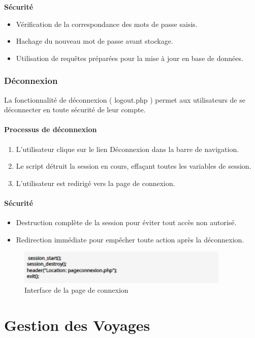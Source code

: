 \documentclass[a4paper,12pt]{article}
\begin{document}
\textbf{Sécurité}
\begin{itemize}
  \item Vérification de la correspondance des mots de passe saisis.
  \item Hachage du nouveau mot de passe avant stockage.
  \item Utilisation de requêtes préparées pour la mise à jour en base de données.
\end{itemize}

\subsubsection{Déconnexion}
La fonctionnalité de déconnexion ( logout.php ) permet aux utilisateurs de se
déconnecter en toute sécurité de leur compte. 
\paragraph{Processus de déconnexion}
\begin{enumerate}
  \item L'utilisateur clique sur le lien \og Déconnexion \fg{} dans la barre de navigation.
  \item Le script détruit la session en cours, effaçant toutes les variables de session.
  \item L'utilisateur est redirigé vers la page de connexion.
\end{enumerate}

\paragraph{Sécurité}
\begin{itemize}
  \item Destruction complète de la session pour éviter tout accès non autorisé.
  \item Redirection immédiate pour empêcher toute action après la déconnexion.
\end{itemize}
\begin{figure}[H]
  \centering
  \includegraphics[width=0.9\textwidth]{capture5.png}
  \caption{Interface de la page de connexion}
\end{figure}
\section{Gestion des Voyages}
\end{document}
